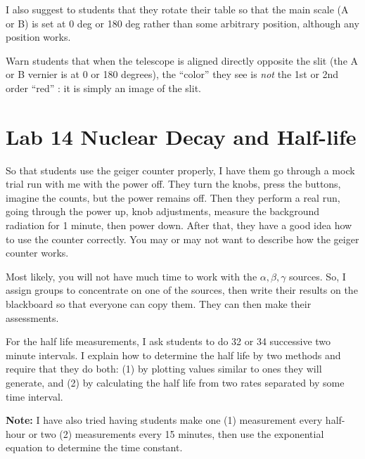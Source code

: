 I also suggest to students that they rotate their table so that the main scale (A or B) is set at 0 deg or 180 deg rather than some arbitrary position, although any position works.

Warn students that when the telescope is aligned directly opposite the slit (the A or B vernier is at 0 or 180 degrees), the ``color'' they see is \emph{not} the 1st or 2nd order ``red'' : it is simply an image of the slit.
\section{Lab 14 Nuclear Decay and Half-life}
So that students use the geiger counter properly, I have them go through a mock trial run with me with the power off. They turn the knobs, press the buttons, imagine the counts, but the power remains off. Then they perform a real run, going through the power up, knob adjustments, measure the background radiation for 1 minute, then power down. After that, they have a good idea how to use the counter correctly. You may or may not want to describe how the geiger counter works.

Most likely, you will not have much time to work with the $\alpha, \beta, \gamma$ sources. So, I assign groups to concentrate on one of the sources, then write their results on the blackboard so that everyone can copy them. They can then make their assessments.

For the half life measurements, I ask students to do 32 or 34 successive two minute intervals. I explain how to determine the half life by two methods and require that they do both: (1) by plotting values similar to ones they will generate, and (2) by calculating the half life from two rates separated by some time interval.

\textbf{Note:} I have also tried having students make one (1) measurement every half-hour or two (2) measurements every 15 minutes, then use the exponential equation to determine the time constant.

